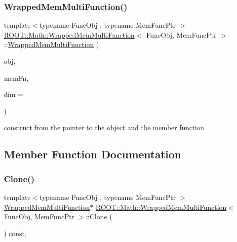 \subsubsection{\texorpdfstring{WrappedMemMultiFunction()}{WrappedMemMultiFunction()}\hspace{0.1cm}{\footnotesize\ttfamily [2/2]}}
{\footnotesize\ttfamily template$<$typename Func\+Obj , typename Mem\+Func\+Ptr $>$ \\
\mbox{\hyperlink{classROOT_1_1Math_1_1WrappedMemMultiFunction}{R\+O\+O\+T\+::\+Math\+::\+Wrapped\+Mem\+Multi\+Function}}$<$ Func\+Obj, Mem\+Func\+Ptr $>$\+::\mbox{\hyperlink{classROOT_1_1Math_1_1WrappedMemMultiFunction}{Wrapped\+Mem\+Multi\+Function}} (\begin{DoxyParamCaption}\item[{Func\+Obj \&}]{obj,  }\item[{Mem\+Func\+Ptr}]{mem\+Fn,  }\item[{unsigned int}]{dim = {} }\end{DoxyParamCaption})\hspace{0.3cm}{\ttfamily [inline]}}

construct from the pointer to the object and the member function 

\subsection{Member Function Documentation}
\mbox{\label{classROOT_1_1Math_1_1WrappedMemMultiFunction_ab9f49fc9a151e8d921dbe9cb148c1fc8}} 
\subsubsection{\texorpdfstring{Clone()}{Clone()}\hspace{0.1cm}{\footnotesize\ttfamily [1/2]}}
{\footnotesize\ttfamily template$<$typename Func\+Obj , typename Mem\+Func\+Ptr $>$ \\
\mbox{\hyperlink{classROOT_1_1Math_1_1WrappedMemMultiFunction}{Wrapped\+Mem\+Multi\+Function}}$\ast$ \mbox{\hyperlink{classROOT_1_1Math_1_1WrappedMemMultiFunction}{R\+O\+O\+T\+::\+Math\+::\+Wrapped\+Mem\+Multi\+Function}}$<$ Func\+Obj, Mem\+Func\+Ptr $>$\+::Clone (\begin{DoxyParamCaption}{ }\end{DoxyParamCaption}) const\hspace{0.3cm}{\ttfamily [inline]}, {\ttfamily [virtual]}}




